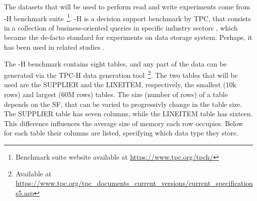 The datasets that will be used to perform read and write experiments come from -H benchmark suite~\footnote{Benchmark suite website available at \url{https://www.tpc.org/tpch/}}. -H is a decision support benchmark by \gls{TPC}, that consists in a collection of business-oriented queries in specific industry sectors \cite{transactionprocessingperformancecounciltpcTPCH_v301pdf1993}, which became the de-facto standard for experiments on data storage system. Perhaps, it has been used in related studies \cite{raasveldtDuckDBEmbeddableAnalytical2019,behmPhotonFastQuery2022,manfrediReducingReadWrite2024}. 

The -H benchmark contains eight tables, and any part of the data can be generated via the \gls{TPC}-H data generation tool~\footnote{Available at \url{https://www.tpc.org/tpc_documents_current_versions/current_specifications5.asp}}. The two tables that will be used are the SUPPLIER and the LINEITEM, respectively, the smallest (10k rows) and largest (60M rows) tables. The size (number of rows) of a table depends on the \gls{SF}, that can be varied to progressivly change in the table size. The SUPPLIER table has seven columns, while the LINEITEM table has sixteen. This difference influences the average size of memory each row occupies. Below for each table their columns are listed, specifying which data type they store.
